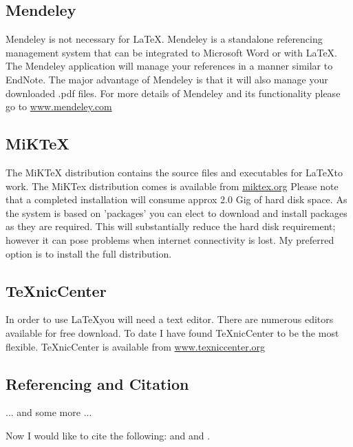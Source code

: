 \subsection{Mendeley}

Mendeley is not necessary for \LaTeX.  Mendeley is a standalone referencing management system that can be integrated to Microsoft Word or with \LaTeX.  The Mendeley application will manage your references in a manner similar to EndNote.  The major advantage of Mendeley is that it will also manage your downloaded .pdf files.  For more details of Mendeley and its functionality please go to \href{http://www.mendeley.com/}{www.mendeley.com} 





\subsection{MiKTeX}

The MiKTeX distribution contains the source files and executables for \LaTeX  to work.  The MiKTex distribution comes is available  from \href{http://miktex.org/}{miktex.org}  Please note that a completed installation will consume approx 2.0 Gig of hard disk space.  As the system is based on 'packages' you can elect to download and install packages as they are required.  This will substantially reduce the hard disk requirement; however it can pose problems when internet connectivity is lost.  My preferred option is to install the full distribution.  


\subsection{TeXnicCenter}

In order to use \LaTeX you will need a text editor.  There are numerous editors available for free download.  To date I have found TeXnicCenter to be the most flexible.  TeXnicCenter is available from  \href{http://www.texniccenter.org/}{www.texniccenter.org} 






\subsection{Referencing and Citation}
... and some more ...

Now I would like to cite the following: \cite{latex} and \cite{texbook}
and \cite{Rud73}.


